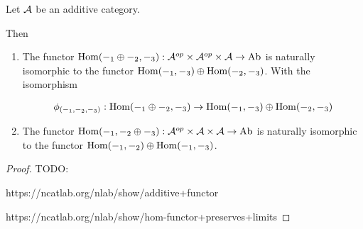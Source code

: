 \begin{theorem} %
    Let \( {\mathcal{A}} \) be an additive category.
    
    Then 
    \begin{enumerate}
        \item {
            The functor \( \operatorname{Hom}(-_1 \oplus -_2, -_3): {\mathcal{A}}^{op} \times {\mathcal{A}}^{op} \times {\mathcal{A}} \to \operatorname{Ab} \) is naturally isomorphic to the functor \( \operatorname{Hom}(-_1, -_3) \oplus \operatorname{Hom}(-_2, -_3) \). With the isomorphism

            \begin{center}
            \end{center}

            \begin{align*}
                \phi_{\left(-_1, -_2, -_3\right)}: \operatorname{Hom}(-_1 \oplus -_2, -_3) &\to \operatorname{Hom}(-_1, -_3) \oplus \operatorname{Hom}(-_2, -_3) \\
            \end{align*}
        }
        \item {
            The functor \( \operatorname{Hom}(-_1, -_2 \oplus -_3): {\mathcal{A}}^{op} \times {\mathcal{A}} \times {\mathcal{A}} \to \operatorname{Ab} \) is naturally isomorphic to the functor \( \operatorname{Hom}(-_1, -_2) \oplus \operatorname{Hom}(-_1, -_3) \).
        }
    \end{enumerate}
\end{theorem}
\begin{proof}
    TODO: 
    
    https://ncatlab.org/nlab/show/additive+functor

    https://ncatlab.org/nlab/show/hom-functor+preserves+limits
\end{proof}


